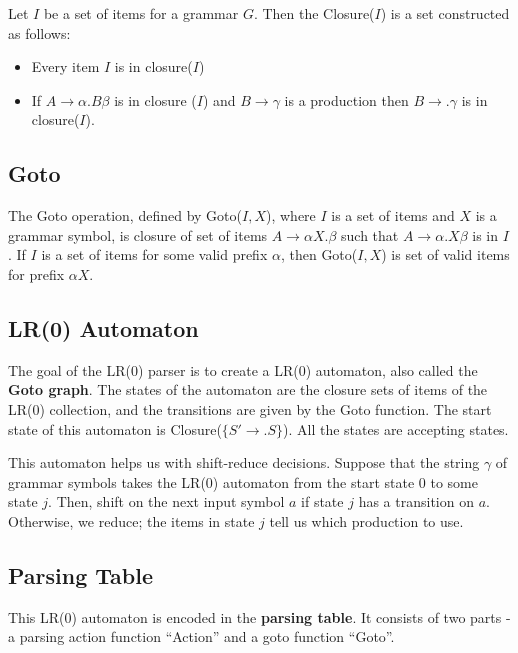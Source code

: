\documentclass[12pt,letterpaper]{book}
\theoremstyle{definition}
\begin{document}
Let $I$ be a set of items for a grammar $G$. Then the Closure($I$) is a set constructed as follows:

\begin{itemize}
  \item Every item $I$ is in closure($I$)
  \item If $A \rightarrow \alpha . B \beta$ is in closure ($I$) and $B \rightarrow \gamma$ is a production then $B \rightarrow .\gamma$ is in closure($I$).
\end{itemize}

\subsection{Goto}

The Goto operation, defined by Goto($I,X$), where $I$ is a set of items and $X$ is a grammar symbol, is closure of set of items $A \rightarrow \alpha X. \beta$ such that $A \rightarrow \alpha . X \beta$ is in $I$. If $I$ is a set of items for some valid prefix $\alpha$, then Goto($I,X$) is set of valid items for prefix $\alpha X$. 

\subsection{LR(0) Automaton}

The goal of the LR(0) parser is to create a LR(0) automaton, also called the \textbf{Goto graph}. The states of the automaton are the closure sets of items of the LR(0) collection, and the transitions are given by the Goto function. The start state of this automaton is Closure($\{S' \rightarrow .S\}$). All the states are accepting states.

This automaton helps us with shift-reduce decisions. Suppose that the string $\gamma$ of grammar symbols takes the LR(0) automaton from the start state 0 to some state $j$. Then, shift on the next input symbol $a$ if state $j$ has a transition on $a$. Otherwise, we reduce; the items in state $j$ tell us which production to use.

\subsection{Parsing Table}

This LR(0) automaton is encoded in the \textbf{parsing table}. It consists of two parts - a parsing action function ``Action'' and a goto function ``Goto''.
\end{document}
